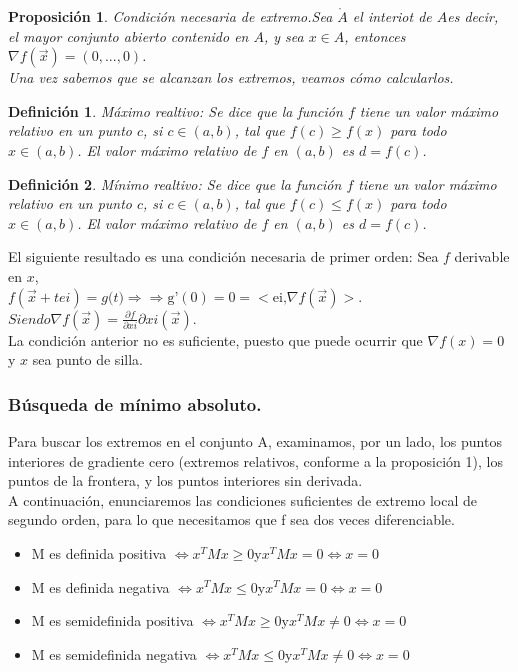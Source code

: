 \documentclass[a4paper,10pt]{article}
\newtheorem{proposition}{Proposición}
\newtheorem{definition}{Definición}
\begin{document}
\begin{proposition}
Condición necesaria de extremo.Sea $\mathring{A}$ el interiot de $A$es decir, el mayor conjunto abierto
contenido en $A$, y sea $x \in A$, entonces $ \nabla f(\vec{x}) = (0,...,0)$.\\
Una vez sabemos que se alcanzan los extremos, veamos cómo calcularlos.
\end{proposition}
\begin{definition}
Máximo realtivo: Se dice que la función $f$ tiene un valor máximo relativo en un punto $c$, si $c \in (a, b)$, tal que $f(c)  \geqslant f(x)$ para todo $x \in (a, b)$. El valor máximo relativo de $f$ en $(a, b)$ es $d = f(c)$.
\end{definition}
\begin{definition}
Mínimo realtivo: Se dice que la función $f$ tiene un valor máximo relativo en un punto $c$, si $c \in (a, b)$, tal que $f(c)  \leqslant f(x)$ para todo $x \in (a, b)$. El valor máximo relativo de $f$ en $(a, b)$ es $d = f(c)$.
\end{definition}
El siguiente resultado es una condición necesaria de primer orden:
Sea $f$ derivable en $x$,\\$  f(\vec{x}+tei)=\textit{g(t)}\Rightarrow 
 \Rightarrow \text{g'} (0)=0= <\text{ei,} \nabla f(\vec{x}) > $.
${ Siendo }  \nabla f(\vec{x})= \frac{\partial f}{\partial xi} \partial xi (\vec{x})$.\\
La condición anterior no es suficiente, puesto que puede ocurrir que $\nabla f(x) = 0$
y $x$ sea punto de silla.


\subsubsection{Búsqueda de mínimo absoluto.}
Para buscar los extremos en el conjunto A, examinamos, por un lado, los
puntos interiores de gradiente cero (extremos relativos, conforme a la proposición
1), los puntos de la frontera, y los puntos interiores sin derivada. 
\\A continuación, enunciaremos las condiciones suficientes de extremo local de
segundo orden, para lo que necesitamos que f sea dos veces diferenciable.
\begin{itemize}
\item M es definida positiva $\Longleftrightarrow x^TMx \geq 0$y$x^TMx=0\Leftrightarrow x=0$
\item M es definida negativa  $\Longleftrightarrow x^TMx \leq0$y$x^TMx=0\Leftrightarrow x=0$
\item M es semidefinida positiva  $\Longleftrightarrow x^TMx \geq0$y$x^TMx\neq0\Leftrightarrow x=0$
\item M es semidefinida negativa  $\Longleftrightarrow x^TMx \leq0$y$x^TMx\neq0\Leftrightarrow x=0$
\end{itemize}
\end{document}

